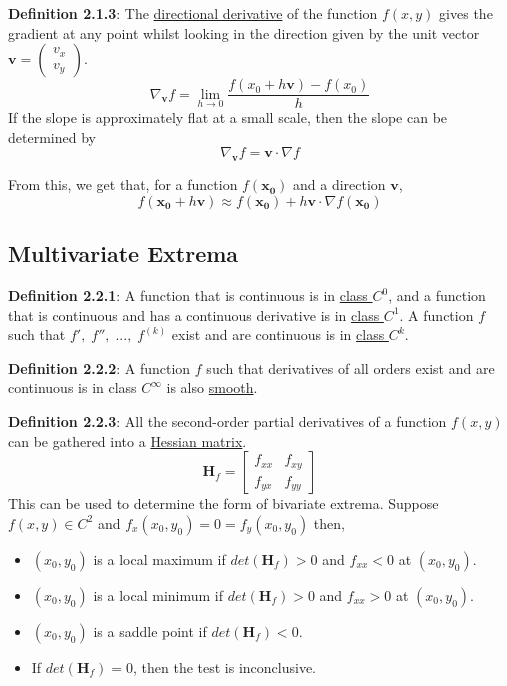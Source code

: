 \documentclass{article}
\newcommand{\separate}[1] {\vspace{#1 pt}\noindent}
\newcommand{\hessian}[1]{\mathbf{H}_{#1}}
\newcommand{\definition}[2]{\textbf{Definition #1}: #2\label{def:#1}}
\begin{document}
\separate{7}\definition{2.1.3}{The \underline{directional derivative} of the function \(f(x,y)\) gives the gradient at any point whilst looking in the direction given by the unit vector \(\mathbf{v} = \begin{pmatrix}v_x\\v_y\end{pmatrix}\).}
\begin{equation}
    \nabla_{\mathbf{v}} f = \lim_{h \rightarrow 0}\frac{f(x_0 + h\mathbf{v}) - f(x_0)}{h}
\end{equation}
If the slope is approximately flat at a small scale, then the slope can be determined by
\begin{equation}
    \nabla_{\mathbf{v}} f = \mathbf{v} \cdot \nabla f
\end{equation}

\separate{7}From this, we get that, for a function \(f(\mathbf{x_0})\) and a direction \(\mathbf{v}\),
\begin{equation}
    f(\mathbf{x_0} + h \mathbf{v}) \approx f(\mathbf{x_0}) + h \mathbf{v} \cdot \nabla f(\mathbf{x_0})
\end{equation}

\newpage\subsection{Multivariate Extrema}

\definition{2.2.1}{A function that is continuous is in \underline{class \(C^0\)}, and a function that is continuous and has a continuous derivative is in \underline{class \(C^1\)}. A function \(f\) such that \(f',\;f'',\;...,\;f^{(k)}\) exist and are continuous is in \underline{class \(C^k\)}.}

\separate{7}\definition{2.2.2}{A function \(f\) such that derivatives of all orders exist and are continuous is in class \(C^\infty\) is also \underline{smooth}.}

\separate{7}\definition{2.2.3}{All the second-order partial derivatives of a function \(f(x,y)\) can be gathered into a \underline{Hessian matrix}.}
\begin{equation}
    \hessian{f} = \begin{bmatrix} f_{xx} & f_{xy} \\ f_{yx} & f_{yy} \end{bmatrix}
\end{equation}
This can be used to determine the form of bivariate extrema. Suppose \(f(x,y) \in C^2\) and \(f_x(x_0,y_0) = 0 = f_y(x_0,y_0)\) then,
\begin{itemize}
    \item \((x_0,y_0)\) is a local maximum if \(det(\hessian{f}) > 0\) and \(f_{xx} < 0\) at \((x_0,y_0)\).
    \item \((x_0,y_0)\) is a local minimum if \(det(\hessian{f}) > 0\) and \(f_{xx} > 0\) at \((x_0,y_0)\).
    \item \((x_0,y_0)\) is a saddle point if \(det(\hessian{f}) < 0\).
    \item If \(det(\hessian{f}) = 0\), then the test is inconclusive.
\end{itemize}
\end{document}
